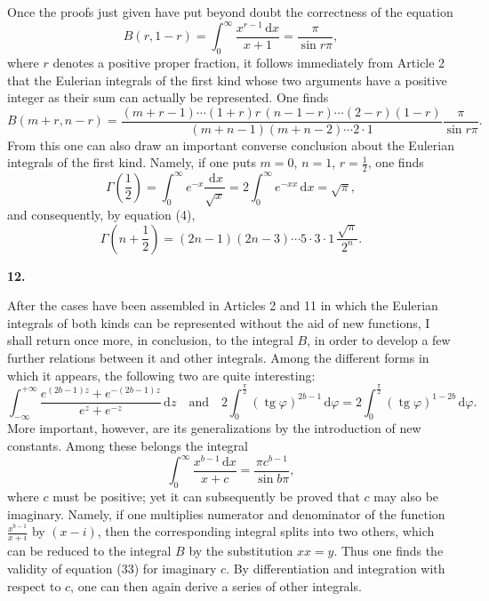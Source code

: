 \documentclass[11pt]{article}
\newcommand{\dd}{\,\mathrm d}
\newcommand{\tg}{\operatorname{tg}}
\newcommand{\art}[1]{\bigskip\begin{center}\large\bfseries #1.\end{center}\nopagebreak}
\begin{document}
Once the proofs just given have put beyond doubt the correctness of the equation
\[
B(r,1-r)=\int_0^\infty\frac{x^{r-1}\dd x}{x+1}
=\frac{\pi}{\sin r\pi},
\]
where $r$ denotes a positive proper fraction, it follows immediately from Article 2 that the Eulerian integrals of the first kind whose two arguments have a positive integer as their sum can actually be represented. One finds
\begin{equation}
B(m+r,n-r)=
\frac{(m+r-1)\cdots(1+r)r\,(n-1-r)\cdots(2-r)(1-r)}
     {(m+n-1)(m+n-2)\cdots2\cdot1}
\frac{\pi}{\sin r\pi}.
\tag{30}
\end{equation}
From this one can also draw an important converse conclusion about the Eulerian integrals of the first kind. Namely, if one puts $m=0$, $n=1$, $r=\frac12$, one finds
\begin{equation}
\Gamma\!\left(\frac12\right)
=\int_0^\infty e^{-x}\frac{\dd x}{\sqrt{x}}
=2\int_0^\infty e^{-xx}\dd x=\sqrt{\pi},
\tag{31}
\end{equation}
and consequently, by equation (4),
\begin{equation}
\Gamma\!\left(n+\frac12\right)
=(2n-1)(2n-3)\cdots5\cdot3\cdot1\,\frac{\sqrt{\pi}}{2^n}.
\tag{32}
\end{equation}

\art{12}

After the cases have been assembled in Articles 2 and 11 in which the Eulerian integrals of both kinds can be represented without the aid of new functions, I shall return once more, in conclusion, to the integral $B$, in order to develop a few further relations between it and other integrals. Among the different forms in which it appears, the following two are quite interesting:
\[
\int_{-\infty}^{+\infty}
\frac{e^{(2b-1)z}+e^{-(2b-1)z}}{e^z+e^{-z}}\dd z
\quad\text{and}\quad
2\int_0^{\frac{\pi}{2}}(\tg\varphi)^{2b-1}\dd\varphi
=2\int_0^{\frac{\pi}{2}}(\tg\varphi)^{1-2b}\dd\varphi .
\]
More important, however, are its generalizations by the introduction of new constants. Among these belongs the integral
\begin{equation}
\int_0^\infty\frac{x^{b-1}\dd x}{x+c}
=\frac{\pi c^{b-1}}{\sin b\pi},
\tag{33}
\end{equation}
where $c$ must be positive; yet it can subsequently be proved that $c$ may also be imaginary. Namely, if one multiplies numerator and denominator of the function $\frac{x^{b-1}}{x+i}$ by $(x-i)$, then the corresponding integral splits into two others, which can be reduced to the integral $B$ by the substitution $xx=y$. Thus one finds the validity of equation (33) for imaginary $c$. By differentiation and integration with respect to $c$, one can then again derive a series of other integrals.
\end{document}
